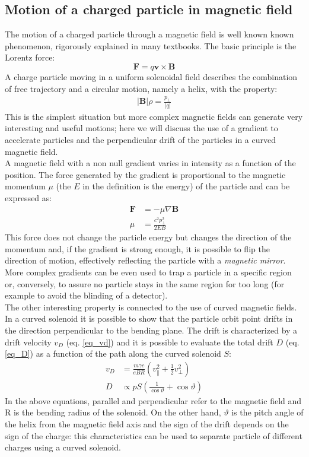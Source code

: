 \documentclass[12pt,a4paper,openright, oneside, titlepage]{book} %
\begin{document}
\subsection{Motion of a charged particle in magnetic field}
\label{magnets}
The motion of a charged particle through a magnetic field is well known known phenomenon, 
rigorously explained in many textbooks. The basic principle is the Lorentz force:
$$\textbf{F}=q\textbf{v}\times\textbf{B}$$
A charge particle moving in a uniform solenoidal field describes the combination of free trajectory 
and a circular motion, namely a helix, with the property:
\begin{align}
|\textbf{B}|\rho = \frac{p_\perp}{|q|} 
\label{eq_brho}
\end{align}
This is the simplest situation but more complex magnetic fields can generate very interesting and useful motions; 
here we will discuss the use of a gradient to accelerate particles 
and the perpendicular drift of the particles in a curved magnetic field.\\
A magnetic field with a non null gradient varies in intensity as a function of the position. 
The force generated by the gradient is proportional to the magnetic momentum $\mu$ 
(the $E$ in the definition is the energy) of the particle and can be expressed as:
\begin{align}
\textbf{F} &= -\mu \nabla \textbf{B} \\
\mu &= \frac{c^2 p_\perp^2}{2EB}
\end{align}
This force does not change the particle energy but changes the direction of the momentum and, 
if the gradient is strong enough, it is possible to flip the direction of motion, 
effectively reflecting the particle with a \textit{magnetic mirror}. 
More complex gradients can be even used to trap a particle in a specific region 
or, conversely, to assure no particle stays in the same region for too long 
(for example to avoid the blinding of a detector).\\
The other interesting property is connected to the use of curved magnetic fields. 
In a curved solenoid it is possible to show that 
the particle orbit point drifts in the direction perpendicular to the bending plane. 
The drift is characterized by a drift velocity $v_D$ (eq. \ref{eq_vd}) 
and it is possible to evaluate the total drift $D$ (eq. \ref{eq_D}) 
as a function of the path along the curved solenoid $S$:
\begin{align}
v_D&=\frac{m\gamma c}{eBR}\left(v^2_\parallel+\frac{1}{2}v^2_\perp\right) \label{eq_vd}  \\
D&\propto pS\left(\frac{1}{\cos \vartheta}  + \cos \vartheta \right) \label{eq_D}
\end{align}
In the above equations, parallel and perpendicular refer to the magnetic field and R is the bending radius of the solenoid. 
On the other hand, $\vartheta$ is the pitch angle of the helix from the magnetic field axis 
and the sign of the drift depends on the sign of the charge: 
this characteristics can be used to separate particle of different charges using a curved solenoid.
\end{document}
